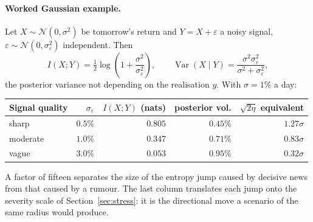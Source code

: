 \documentclass[11pt]{article}
\theoremstyle{definition}
\theoremstyle{remark}
\begin{document}
\paragraph{Worked Gaussian example.} Let $X\sim\mathcal N(0,\sigma^2)$ be
tomorrow's return and $Y=X+\varepsilon$ a noisy signal,
$\varepsilon\sim\mathcal N(0,\sigma_\varepsilon^2)$ independent. Then
\begin{equation}
\label{eq:mi-gauss}
I(X;Y)=\tfrac12\log\!\left(1+\frac{\sigma^2}{\sigma_\varepsilon^2}\right),
\qquad
\operatorname{Var}(X\mid Y)=\frac{\sigma^2\sigma_\varepsilon^2}{\sigma^2+\sigma_\varepsilon^2},
\end{equation}
the posterior variance not depending on the realisation $y$. With
$\sigma=1\%$ a day:

\begin{center}
\small
\begin{tabular}{@{}lrrrr@{}}
\toprule
Signal quality & $\sigma_\varepsilon$ & $I(X;Y)$ (nats) & posterior vol. & $\sqrt{2\eta}$ equivalent \\
\midrule
sharp    & $0.5\%$ & $0.805$ & $0.45\%$ & $1.27\sigma$ \\
moderate & $1.0\%$ & $0.347$ & $0.71\%$ & $0.83\sigma$ \\
vague    & $3.0\%$ & $0.053$ & $0.95\%$ & $0.32\sigma$ \\
\bottomrule
\end{tabular}
\end{center}

A factor of fifteen separates the size of the entropy jump caused by decisive
news from that caused by a rumour. The last column translates each jump onto the
severity scale of Section~\ref{sec:stress}: it is the directional move a
scenario of the same radius would produce.
\end{document}

